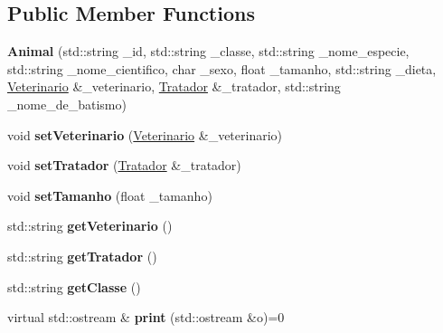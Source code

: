 \subsection*{Public Member Functions}
\begin{DoxyCompactItemize}
\item 
\mbox{\label{classAnimal_a99fe9393f253449052651d550d124a5f}} 
{\bfseries Animal} (std\+::string \+\_\+id, std\+::string \+\_\+classe, std\+::string \+\_\+nome\+\_\+especie, std\+::string \+\_\+nome\+\_\+cientifico, char \+\_\+sexo, float \+\_\+tamanho, std\+::string \+\_\+dieta, \hyperlink{classVeterinario}{Veterinario} \&\+\_\+veterinario, \hyperlink{classTratador}{Tratador} \&\+\_\+tratador, std\+::string \+\_\+nome\+\_\+de\+\_\+batismo)
\item 
\mbox{\label{classAnimal_ab8240e383d61d986083c21947d232b05}} 
void {\bfseries set\+Veterinario} (\hyperlink{classVeterinario}{Veterinario} \&\+\_\+veterinario)
\item 
\mbox{\label{classAnimal_ab6ab444f36053a042ff48beba0827138}} 
void {\bfseries set\+Tratador} (\hyperlink{classTratador}{Tratador} \&\+\_\+tratador)
\item 
\mbox{\label{classAnimal_a7c90e853bf9f77be8d1cf7e2583acdd6}} 
void {\bfseries set\+Tamanho} (float \+\_\+tamanho)
\item 
\mbox{\label{classAnimal_ae6fb5bbe6940fd1e4ce43ff1a5dbffc1}} 
std\+::string {\bfseries get\+Veterinario} ()
\item 
\mbox{\label{classAnimal_abe5e5ecbc9c3f7da286091637c6e69d2}} 
std\+::string {\bfseries get\+Tratador} ()
\item 
\mbox{\label{classAnimal_a22e54ff48117237f9a201f5eca0eea81}} 
std\+::string {\bfseries get\+Classe} ()
\item 
\mbox{\label{classAnimal_aab90929d32083cd33cb22df862fbff82}} 
virtual std\+::ostream \& {\bfseries print} (std\+::ostream \&o)=0
\end{DoxyCompactItemize}

